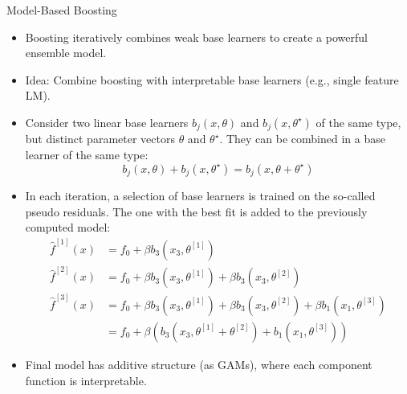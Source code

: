 \documentclass[11pt,compress,t,notes=noshow, aspectratio=169, xcolor=table]{beamer}
\begin{document}
\begin{frame}{Model-Based Boosting}

\begin{itemize}
\item
Boosting iteratively combines weak base learners to create a powerful ensemble model.
\item
Idea: Combine boosting with interpretable base learners (e.g., single feature LM). 
\item
Consider two linear base learners $b_j(x, \theta)$ and $b_j(x, \theta^{\star})$ of the same type, but distinct parameter vectors $\theta$ and $\theta^{\star}$. They can be combined in a base learner of the same type:
$$
b_j(x, \theta) + b_j(x, \theta^{\star}) = b_j(x, \theta + \theta^{\star})
$$
\item In each iteration, a selection of base learners is trained on the so-called pseudo residuals. The one with the best fit is added to the previously computed model:
\medskip
\begin{align*}
\widehat{f}^{[1]}(x) &= f_0 + \beta b_3(x_3, \theta^{[1]}) \\
\widehat{f}^{[2]}(x) &= f_0 + \beta b_3(x_3, \theta^{[1]}) + \beta b_3(x_3, \theta^{[2]})\\
\widehat{f}^{[3]}(x) &= f_0 + \beta b_3(x_3, \theta^{[1]}) + \beta b_3(x_3, \theta^{[2]}) + \beta b_1(x_1, \theta^{[3]}) \\
&= f_0 + \beta \left(b_3(x_3, \theta^{[1]} + \theta^{[2]}) + b_1(x_1, \theta^{[3]})\right)
\end{align*}

\item Final model has additive structure (as GAMs), where each component function is interpretable.

\end{itemize}
\end{frame}





\end{document}
